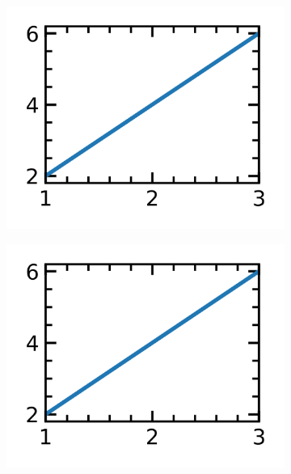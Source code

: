 \documentclass[12pt,a4paper,twoside]{article}
\numberwithin{equation}{section}
\renewcommand{\_}{\textscale{.7}{\textunderscore}}
\begin{document}
\begin{figure}[H]
	\centering
	\begin{subfigure}{0.31\linewidth}
		\includegraphics[width=1.0\linewidth]{3x3.png}
	\end{subfigure}
    \begin{subfigure}{0.31\linewidth}
		\includegraphics[width=1.0\linewidth]{3x3.png}
	\end{subfigure}
    \begin{subfigure}{0.31\linewidth}

\end{subfigure}
\end{figure}
\end{document}
